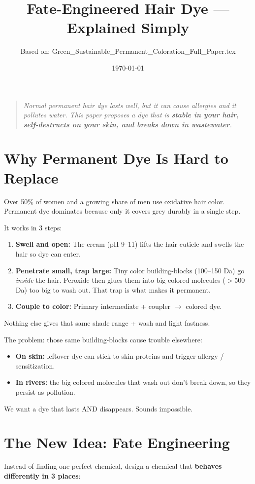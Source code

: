 \documentclass[11pt,a4paper]{article}
\title{\Large\bfseries Fate-Engineered Hair Dye --- Explained Simply}
\author{Based on: Green\_Sustainable\_Permanent\_Coloration\_Full\_Paper.tex}
\date{\today}
\begin{document}
\maketitle

\begin{quote}
\emph{Normal permanent hair dye lasts well, but it can cause allergies and it pollutes water. This paper proposes a dye that is \textbf{stable in your hair, self-destructs on your skin, and breaks down in wastewater}.}
\end{quote}

\section{Why Permanent Dye Is Hard to Replace}
Over 50\% of women and a growing share of men use oxidative hair color. Permanent dye dominates because only it covers grey durably in a single step.

It works in 3 steps:
\begin{enumerate}[leftmargin=1.5em]
\item \textbf{Swell and open:} The cream (pH 9--11) lifts the hair cuticle and swells the hair so dye can enter.
\item \textbf{Penetrate small, trap large:} Tiny color building-blocks (100--150 Da) go \emph{inside} the hair. Peroxide then glues them into big colored molecules ($>$500 Da) too big to wash out. That trap is what makes it permanent.
\item \textbf{Couple to color:} Primary intermediate + coupler $\rightarrow$ colored dye.
\end{enumerate}

Nothing else gives that same shade range + wash and light fastness.

The problem: those same building-blocks cause trouble elsewhere:
\begin{itemize}[leftmargin=1.5em]
\item \textbf{On skin:} leftover dye can stick to skin proteins and trigger allergy / sensitization.
\item \textbf{In rivers:} the big colored molecules that wash out don't break down, so they persist as pollution.
\end{itemize}

We want a dye that lasts AND disappears. Sounds impossible.

\section{The New Idea: Fate Engineering}
Instead of finding one perfect chemical, design a chemical that \textbf{behaves differently in 3 places}:
\end{document}
